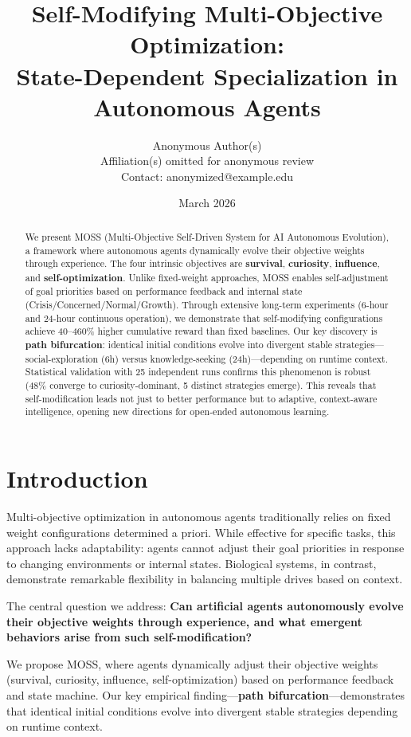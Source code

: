 \documentclass{article}
\title{Self-Modifying Multi-Objective Optimization: \\ State-Dependent Specialization in Autonomous Agents}
\author{
Anonymous Author(s) \\
Affiliation(s) omitted for anonymous review \\
Contact: anonymized@example.edu
}
\date{March 2026}
\begin{document}
\maketitle

\begin{abstract}
We present MOSS (Multi-Objective Self-Driven System for AI Autonomous Evolution), a framework where autonomous agents dynamically evolve their objective weights through experience. The four intrinsic objectives are \textbf{survival}, \textbf{curiosity}, \textbf{influence}, and \textbf{self-optimization}. Unlike fixed-weight approaches, MOSS enables self-adjustment of goal priorities based on performance feedback and internal state (Crisis/Concerned/Normal/Growth). Through extensive long-term experiments (6-hour and 24-hour continuous operation), we demonstrate that self-modifying configurations achieve 40--460\% higher cumulative reward than fixed baselines. Our key discovery is \textbf{path bifurcation}: identical initial conditions evolve into divergent stable strategies---social-exploration (6h) versus knowledge-seeking (24h)---depending on runtime context. Statistical validation with 25 independent runs confirms this phenomenon is robust (48\% converge to curiosity-dominant, 5 distinct strategies emerge). This reveals that self-modification leads not just to better performance but to adaptive, context-aware intelligence, opening new directions for open-ended autonomous learning.
\end{abstract}

\section{Introduction}
Multi-objective optimization in autonomous agents traditionally relies on fixed weight configurations determined a priori. While effective for specific tasks, this approach lacks adaptability: agents cannot adjust their goal priorities in response to changing environments or internal states. Biological systems, in contrast, demonstrate remarkable flexibility in balancing multiple drives based on context.

The central question we address: \textbf{Can artificial agents autonomously evolve their objective weights through experience, and what emergent behaviors arise from such self-modification?}

We propose MOSS, where agents dynamically adjust their objective weights (survival, curiosity, influence, self-optimization) based on performance feedback and state machine. Our key empirical finding---\textbf{path bifurcation}---demonstrates that identical initial conditions evolve into divergent stable strategies depending on runtime context.
\end{document}
